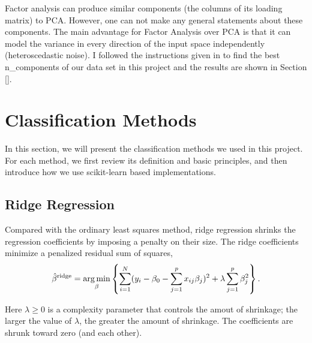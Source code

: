 \documentclass[10pt,journal,compsoc]{IEEEtran}
\DeclareMathOperator*{\argmin}{arg\,min}
\begin{document}
Factor analysis can produce similar components (the columns of its loading matrix) to PCA. However, one can not make any general statements about these components. The main advantage for Factor Analysis over PCA is that it can model the variance in every direction of the input space independently (heteroscedastic noise). I followed the instructions given in \cite{pcavsfa} to find the best n\_components of our data set in this project and the results are shown in Section \ref{}.%

\section{Classification Methods}
\label{sec:classification_methods}
In this section, we will present the classification methods we used in this project. For each method, we first review its definition and basic principles, and then introduce how we use scikit-learn\cite{scikit-learn} based implementations.

\subsection{Ridge Regression}
\label{subsec:ridge_regression}
Compared with the ordinary least squares method, ridge regression shrinks the regression coefficients by imposing a penalty on their size. The ridge coefficients minimize a penalized residual sum of squares,
\begin{equation}
  \label{eq:ridge_regression}
  \hat{\beta}^{\rm ridge} = \argmin_{\beta}\left\{\sum_{i=1}^N(y_i - \beta_0 - \sum_{j=1}^px_{ij}\beta_j)^2 + \lambda\sum_{j=1}^p\beta_j^2\right\}.
\end{equation}

Here $\lambda \geq 0$ is a complexity parameter that controls the amout of shrinkage; the larger the value of $\lambda$, the greater the amount of shrinkage. The coefficients are shrunk toward zero (and each other).
\end{document}
